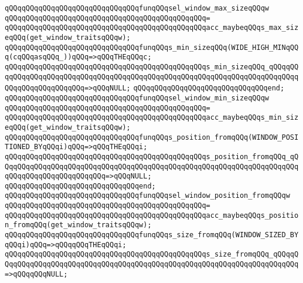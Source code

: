 \newline
\verb|qQQqqQQqqQQqqQQqqQQqqQQqqQQqqQQqfunqQQqsel_window_max_sizeqQQqw|\newline
\verb|qQQqqQQqqQQqqQQqqQQqqQQqqQQqqQQqqQQqqQQqqQQqqQQq=|\newline
\verb|qQQqqQQqqQQqqQQqqQQqqQQqqQQqqQQqqQQqqQQqqQQqqQQqacc_maybeqQQqs_max_sizeqQQq(get_window_traitsqQQqw);|\newline
\newline
\verb|qQQqqQQqqQQqqQQqqQQqqQQqqQQqqQQqfunqQQqs_min_sizeqQQq(WIDE_HIGH_MINqQQq(cqQQqasqQQq_))qQQq=>qQQqTHEqQQqc;|\newline
\verb|qQQqqQQqqQQqqQQqqQQqqQQqqQQqqQQqqQQqqQQqqQQqqQQqs_min_sizeqQQq_qQQqqQQqqQQqqQQqqQQqqQQqqQQqqQQqqQQqqQQqqQQqqQQqqQQqqQQqqQQqqQQqqQQqqQQqqQQqqQQqqQQqqQQqqQQqqQQq=>qQQqNULL;|\newline
\verb|qQQqqQQqqQQqqQQqqQQqqQQqqQQqqQQqend;|\newline
\newline
\verb|qQQqqQQqqQQqqQQqqQQqqQQqqQQqqQQqfunqQQqsel_window_min_sizeqQQqw|\newline
\verb|qQQqqQQqqQQqqQQqqQQqqQQqqQQqqQQqqQQqqQQqqQQqqQQq=|\newline
\verb|qQQqqQQqqQQqqQQqqQQqqQQqqQQqqQQqqQQqqQQqqQQqqQQqacc_maybeqQQqs_min_sizeqQQq(get_window_traitsqQQqw);|\newline
\newline
\verb|qQQqqQQqqQQqqQQqqQQqqQQqqQQqqQQqfunqQQqs_position_fromqQQq(WINDOW_POSITIONED_BYqQQqi)qQQq=>qQQqTHEqQQqi;|\newline
\verb|qQQqqQQqqQQqqQQqqQQqqQQqqQQqqQQqqQQqqQQqqQQqqQQqs_position_fromqQQq_qQQqqQQqqQQqqQQqqQQqqQQqqQQqqQQqqQQqqQQqqQQqqQQqqQQqqQQqqQQqqQQqqQQqqQQqqQQqqQQqqQQqqQQqqQQqqQQq=>qQQqNULL;|\newline
\verb|qQQqqQQqqQQqqQQqqQQqqQQqqQQqqQQqend;|\newline
\newline
\verb|qQQqqQQqqQQqqQQqqQQqqQQqqQQqqQQqfunqQQqsel_window_position_fromqQQqw|\newline
\verb|qQQqqQQqqQQqqQQqqQQqqQQqqQQqqQQqqQQqqQQqqQQqqQQq=|\newline
\verb|qQQqqQQqqQQqqQQqqQQqqQQqqQQqqQQqqQQqqQQqqQQqqQQqacc_maybeqQQqs_position_fromqQQq(get_window_traitsqQQqw);|\newline
\newline
\verb|qQQqqQQqqQQqqQQqqQQqqQQqqQQqqQQqfunqQQqs_size_fromqQQq(WINDOW_SIZED_BYqQQqi)qQQq=>qQQqqQQqTHEqQQqi;|\newline
\verb|qQQqqQQqqQQqqQQqqQQqqQQqqQQqqQQqqQQqqQQqqQQqqQQqs_size_fromqQQq_qQQqqQQqqQQqqQQqqQQqqQQqqQQqqQQqqQQqqQQqqQQqqQQqqQQqqQQqqQQqqQQqqQQqqQQqqQQq=>qQQqqQQqNULL;|\newline
